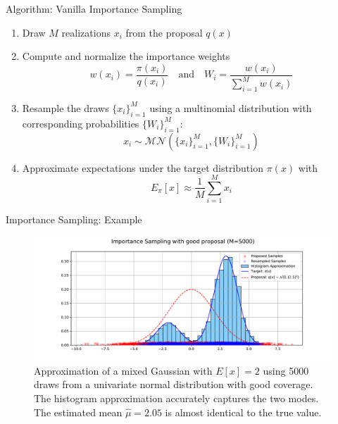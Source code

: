 \documentclass[10pt]{beamer}
\begin{document}
\begin{frame}{Algorithm: Vanilla Importance Sampling}
    \begin{enumerate}
        \item Draw $M$ realizations $x_i$ from the proposal $q(x)$
        \item Compute and normalize the importance weights $$ w(x_i) = \frac{\pi(x_i)}{q(x_i)}\quad \text{and} \quad W_i = \frac{w(x_i)}{\sum_{i=1}^{M}w(x_i)} $$
        \item Resample the draws $\{x_i\}_{i=1}^M$ using a multinomial distribution with corresponding probabilities $\{W_i\}_{i=1}^M$:  $$x_i \sim \mathcal{MN}\left(\{x_i\}_{i=1}^M, \{W_i\}_{i=1}^M\right)$$
        \item Approximate expectations under the target distribution $\pi(x)$ with $$E_{\pi}[x] \approx \frac{1}{M}\sum_{i=1}^M x_i$$ 
    \end{enumerate}
\end{frame}


\begin{frame}{Importance Sampling: Example}
			\begin{figure}
			    \centering
			    \includegraphics[scale=0.5]{pictures/IS_example1.pdf}
			    \caption{Approximation of a mixed Gaussian with $E[x] = 2$ using 5000 draws from a univariate normal distribution with good coverage. The histogram approximation accurately captures the two modes. The estimated mean $\hat{\mu} = 2.05$ is almost identical to the true value.}
			    \label{fig:IS_sim1}
			\end{figure}
			\vspace{0.5cm}
\end{frame}
\end{document}
